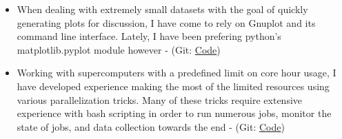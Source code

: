 \documentclass[11pt]{ltxdoc}
\begin{document}
\begin{description}
\begin{itemize}
        \item When dealing with extremely small datasets with the goal of quickly generating plots for discussion, I have come to rely on Gnuplot and its command line interface. Lately, I have been prefering python's matplotlib.pyplot module however - (Git: \href{https://github.com/hlokavarapu/computational_tools/tree/master/Gnuplot_scripts}{Code})
        
        \item Working with supercomputers with a predefined limit on core hour usage, I have developed experience making the most of the limited resources using various parallelization tricks. Many of these tricks require extensive experience with bash scripting in order to run numerous jobs, monitor the state of jobs, and data collection towards the end - (Git: \href{https://github.com/hlokavarapu/computational_tools/tree/master/slurm_scripts}{Code})
      	                
      \end{itemize}
    

\end{description}
\end{document}

